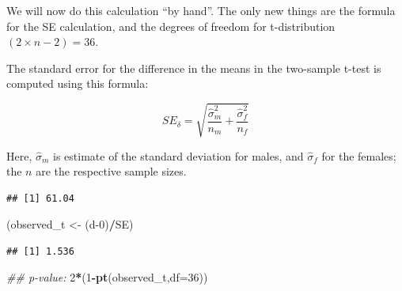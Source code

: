 \documentclass[12pt,]{krantz}
\newenvironment{Shaded}{\begin{snugshade}}{\end{snugshade}}
\newcommand{\CommentTok}[1]{\textcolor[rgb]{0.56,0.35,0.01}{\textit{#1}}}
\newcommand{\DataTypeTok}[1]{\textcolor[rgb]{0.13,0.29,0.53}{#1}}
\newcommand{\DecValTok}[1]{\textcolor[rgb]{0.00,0.00,0.81}{#1}}
\newcommand{\KeywordTok}[1]{\textcolor[rgb]{0.13,0.29,0.53}{\textbf{#1}}}
\newcommand{\NormalTok}[1]{#1}
\newcommand{\OperatorTok}[1]{\textcolor[rgb]{0.81,0.36,0.00}{\textbf{#1}}}
\newcommand{\StringTok}[1]{\textcolor[rgb]{0.31,0.60,0.02}{#1}}
\begin{document}
We will now do this calculation ``by hand''. The only new things are the formula for the SE calculation, and the degrees of freedom for t-distribution \((2\times n - 2)=36\).

The standard error for the difference in the means in the two-sample t-test is computed using this formula:

\begin{equation}
SE_\delta 
= \sqrt{\frac{\hat\sigma_m^2}{n_m} + \frac{\hat\sigma_f^2}{n_f}}
\end{equation}

Here, \(\hat\sigma_m\) is estimate of the standard deviation for males, and \(\hat\sigma_f\) for the females; the \(n\) are the respective sample sizes.

\begin{Shaded}
\end{Shaded}

\begin{verbatim}
## [1] 61.04
\end{verbatim}

\begin{Shaded}
\begin{Highlighting}[]
\NormalTok{(observed_t <-}\StringTok{ }\NormalTok{(d}\DecValTok{-0}\NormalTok{)}\OperatorTok{/}\NormalTok{SE)}
\end{Highlighting}
\end{Shaded}

\begin{verbatim}
## [1] 1.536
\end{verbatim}

\begin{Shaded}
\begin{Highlighting}[]
\CommentTok{## p-value:}
\DecValTok{2}\OperatorTok{*}\NormalTok{(}\DecValTok{1}\OperatorTok{-}\KeywordTok{pt}\NormalTok{(observed_t,}\DataTypeTok{df=}\DecValTok{36}\NormalTok{))}
\end{Highlighting}
\end{Shaded}
\end{document}
